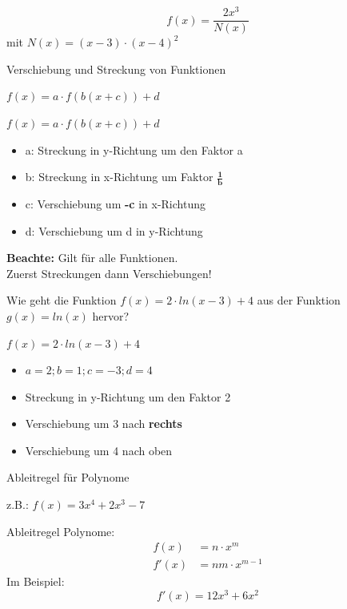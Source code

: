 \documentclass[paper=a6,landscape,ngerman,twoside=true,fontsize=12pt]{scrartcl}
\begin{document}
\begin{antwort}
	\LARGE 
	\[ f(x)=\frac{ 2x^3}{N(x)} \]
	\normalsize mit $N(x)=(x-3) \cdot (x-4)^2$
\end{antwort}
\begin{frage}
	Verschiebung und Streckung von Funktionen  \bigskip
	
	$f(x)=a \cdot f(b(x+c))+d$
\end{frage}
\begin{antwort}
	\large
	$f(x)=a \cdot f(b(x+c))+d$
	\begin{itemize}

		\item a: Streckung in y-Richtung um den Faktor a
		\item b: Streckung in x-Richtung um Faktor $\mathbf{\frac{1}{b}}$
		\item c: Verschiebung um \textbf{-c} in x-Richtung
		\item d: Verschiebung um d in y-Richtung
							
	\end{itemize}
	\textbf{Beachte:} Gilt für alle Funktionen.\\
	 Zuerst Streckungen dann Verschiebungen!
\end{antwort}
\begin{frage}
	Wie geht die Funktion $f(x)=2 \cdot ln(x-3)+4$ aus der 
	Funktion $g(x)=ln(x)$ hervor?
\end{frage}
\begin{antwort}
	$f(x)=2 \cdot ln(x-3)+4$
	\begin{itemize}
		\item $a=2;b=1;c=-3;d=4$
		\item Streckung in y-Richtung um den Faktor 2		
		\item Verschiebung um 3 nach \textbf{rechts}
		\item Verschiebung um 4 nach oben							
	\end{itemize}	
\end{antwort}
\begin{frage}
	Ableitregel für Polynome
	
	z.B.: $f(x)=3x^4+2x^3-7$
	
\end{frage}
\begin{antwort}
	Ableitregel Polynome:
	\begin{align*}
	f(x) &= n \cdot x^m \\
	f'(x) &= nm \cdot x^{m-1}
	\end{align*}
	Im Beispiel:
	\[
	f'(x)=12x^3+6x^2
	\]
\end{antwort}
\end{document}
